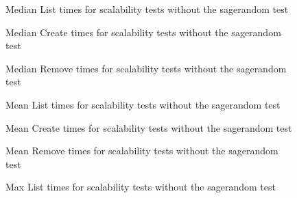 \begin{figure}[!h]
\centering
{}
\caption[Median List Times Without Random Test]{Median List times for scalability tests without the sagerandom test}
\label{fig:norandlistmedian}
\end{figure}

\begin{figure}[!h]
\centering
{}
\caption[Median Create Times Without Random Test]{Median Create times for scalability tests without the sagerandom test}
\label{fig:norandcreatemedian}
\end{figure}

\begin{figure}[!h]
\centering
{}
\caption[Median Remove Times Without Random Test]{Median Remove times for scalability tests without the sagerandom test}
\label{fig:norandremovemedian}
\end{figure}

\begin{figure}[!h]
\centering
{}
\caption[Mean List Times Without Random Test]{Mean List times for scalability tests without the sagerandom test}
\label{fig:norandlistmean}
\end{figure}

\begin{figure}[!h]
\centering
{}
\caption[Mean Create Times Without Random Test]{Mean Create times for scalability tests without the sagerandom test}
\label{fig:norandcreatemean}
\end{figure}

\begin{figure}[!h]
\centering
{}
\caption[Mean Remove Times Without Random Test]{Mean Remove times for scalability tests without the sagerandom test}
\label{fig:norandremovemean}
\end{figure}

\begin{figure}[!h]
\centering
{}
\caption[Max List Times Without Random Test]{Max List times for scalability tests without the sagerandom test}
\label{fig:norandlistmax}
\end{figure}

